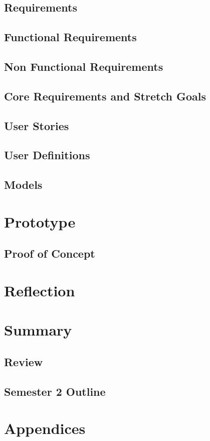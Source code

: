 \documentclass{article}
\begin{document}
\subsection{Requirements}
\subsection{Functional Requirements}
\subsection{Non Functional Requirements}
\subsection{Core Requirements and Stretch Goals}
\subsection{User Stories}
\subsection{User Definitions}
\subsection{Models}
\section{Prototype}
\subsection{Proof of Concept}
\section{Reflection}
\section{Summary}
\subsection{Review}
\subsection{Semester 2 Outline}
\section{Appendices}



\end{document}

